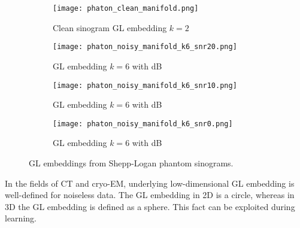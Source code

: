 \begin{figure}[H]
    \captionsetup[subfigure]{justification=centering}
    \centering
    \begin{subfigure}[t]{0.25\textwidth}
        \texttt{[image: phaton\_clean\_manifold.png]}
        \caption{Clean sinogram GL embedding $k=2$}
        \label{fig:clean_manifold}
    \end{subfigure}\hfill
    \begin{subfigure}[t]{0.25\textwidth}
      \texttt{[image: phaton\_noisy\_manifold\_k6\_snr20.png]}
      \caption{GL embedding $k=6$ with  dB}
      \label{fig:noisy_manifold_k6_snr20}
    \end{subfigure}\hfill
    \begin{subfigure}[t]{0.25\textwidth}
      \texttt{[image: phaton\_noisy\_manifold\_k6\_snr10.png]}
      \caption{GL embedding $k=6$ with  dB}
      \label{fig:noisy_manifold_k6_snr10}
    \end{subfigure}\hfill
    \begin{subfigure}[t]{0.25\textwidth}
      \texttt{[image: phaton\_noisy\_manifold\_k6\_snr0.png]}
      \caption{GL embedding $k=6$ with  dB}
      \label{fig:noisy_manifold_k6_snr0}
    \end{subfigure}
    \caption{GL embeddings from Shepp-Logan phantom sinograms.}
    \label{fig:phantom_manifolds}
  \end{figure}

\begin{tcolorbox}[colback=red!5!white,colframe=red!75!black]
    In the fields of CT and cryo-EM, underlying low-dimensional GL embedding is well-defined for noiseless data.
    The GL embedding in 2D is a circle, whereas in 3D the GL embedding is defined as a sphere.
    This fact can be exploited during learning.
\end{tcolorbox}

